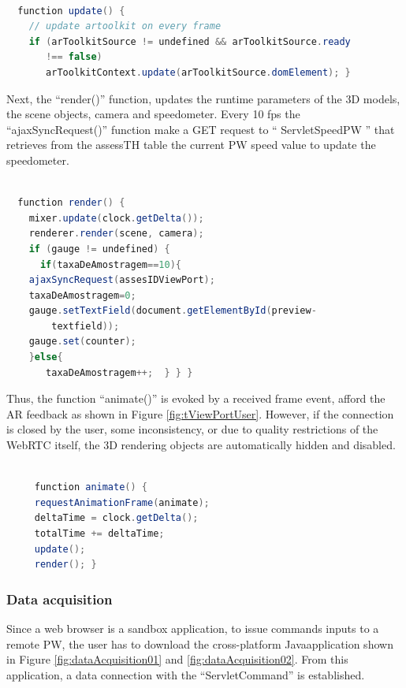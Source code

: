 \begin{lstlisting}[frame=single,language=Java]  % Start your code-block

  function update() {
    // update artoolkit on every frame
    if (arToolkitSource != undefined && arToolkitSource.ready 
       !== false)
       arToolkitContext.update(arToolkitSource.domElement); }
\end{lstlisting}


Next, the ``render()'' function, updates the runtime parameters of the 3D models, the scene objects, camera and speedometer. Every 10 fps the ``ajaxSyncRequest()'' function make a GET request to `` ServletSpeedPW '' that retrieves from the assessTH table the current PW speed value to update the speedometer. \newline 

\begin{lstlisting}[frame=single,language=Java]  % Start your code-block

  function render() {
    mixer.update(clock.getDelta());
    renderer.render(scene, camera);
    if (gauge != undefined) {
      if(taxaDeAmostragem==10){
	ajaxSyncRequest(assesIDViewPort);
	taxaDeAmostragem=0;
	gauge.setTextField(document.getElementById(preview-
        textfield));			
	gauge.set(counter);
	}else{
	   taxaDeAmostragem++;  } } }

\end{lstlisting}

Thus, the function ``animate()'' is evoked by a received frame event, afford the AR feedback as shown in Figure \ref{fig:tViewPortUser}. However, if the connection is closed by the user, some inconsistency, or due to quality restrictions of the WebRTC itself,  the 3D rendering objects are automatically hidden and disabled. \newline

\begin{lstlisting}[frame=single,language=Java]  % Start your code-block

     function animate() {
     requestAnimationFrame(animate);
     deltaTime = clock.getDelta();
     totalTime += deltaTime;
     update();
     render(); }
\end{lstlisting}


\subsubsection{Data acquisition} 


Since a web browser is a sandbox application, to issue commands inputs to a remote PW, the user has to download the cross-platform Java\texttrademark  \hspace{4pt}application shown in Figure \ref{fig:dataAcquisition01} and \ref{fig:dataAcquisition02}. From this application, a data connection with the ``ServletCommand'' is established. 

